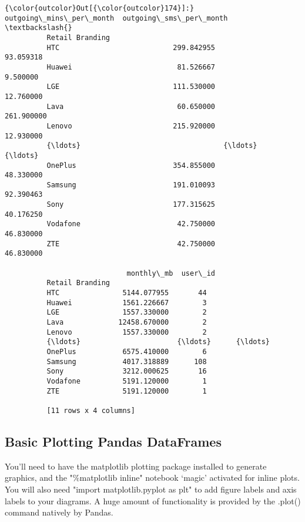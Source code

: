 \documentclass[11pt]{article}
\begin{document}
\begin{Verbatim}[commandchars=\\\{\}]
{\color{outcolor}Out[{\color{outcolor}174}]:}                  outgoing\_mins\_per\_month  outgoing\_sms\_per\_month  \textbackslash{}
          Retail Branding                                                    
          HTC                           299.842955               93.059318   
          Huawei                         81.526667                9.500000   
          LGE                           111.530000               12.760000   
          Lava                           60.650000              261.900000   
          Lenovo                        215.920000               12.930000   
          {\ldots}                                  {\ldots}                     {\ldots}   
          OnePlus                       354.855000               48.330000   
          Samsung                       191.010093               92.390463   
          Sony                          177.315625               40.176250   
          Vodafone                       42.750000               46.830000   
          ZTE                            42.750000               46.830000   
          
                             monthly\_mb  user\_id  
          Retail Branding                         
          HTC               5144.077955       44  
          Huawei            1561.226667        3  
          LGE               1557.330000        2  
          Lava             12458.670000        2  
          Lenovo            1557.330000        2  
          {\ldots}                       {\ldots}      {\ldots}  
          OnePlus           6575.410000        6  
          Samsung           4017.318889      108  
          Sony              3212.000625       16  
          Vodafone          5191.120000        1  
          ZTE               5191.120000        1  
          
          [11 rows x 4 columns]
\end{Verbatim}
            
    \subsection{Basic Plotting Pandas
DataFrames}\label{basic-plotting-pandas-dataframes}

You'll need to have the matplotlib plotting package installed to
generate graphics, and the "\%matplotlib inline" notebook `magic'
activated for inline plots. You will also need "import matplotlib.pyplot
as plt" to add figure labels and axis labels to your diagrams. A huge
amount of functionality is provided by the .plot() command natively by
Pandas.
\end{document}
